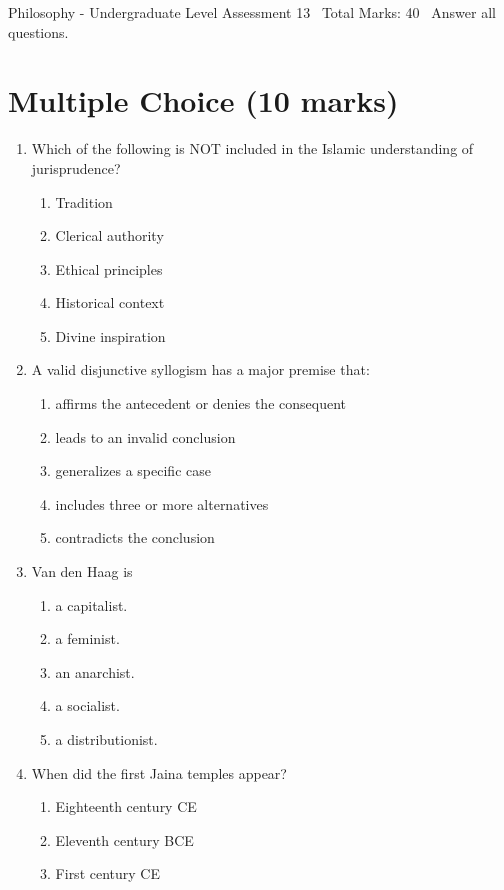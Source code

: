 \documentclass[12pt]{article}
\begin{document}
\begin{center}
Philosophy - Undergraduate Level Assessment 13 \
Total Marks: 40 \
Answer all questions.
\end{center}

\section*{Multiple Choice (10 marks)}
\begin{enumerate}[label=\arabic*.]
\item Which of the following is NOT included in the Islamic understanding of jurisprudence?
\begin{enumerate}[label=(\alph*)]
    \item Tradition
    \item Clerical authority
    \item Ethical principles
    \item Historical context
    \item Divine inspiration
\end{enumerate}
\item A valid disjunctive syllogism has a major premise that:
\begin{enumerate}[label=(\alph*)]
    \item affirms the antecedent or denies the consequent
    \item leads to an invalid conclusion
    \item generalizes a specific case
    \item includes three or more alternatives
    \item contradicts the conclusion
\end{enumerate}
\item Van den Haag is
\begin{enumerate}[label=(\alph*)]
    \item a capitalist.
    \item a feminist.
    \item an anarchist.
    \item a socialist.
    \item a distributionist.
\end{enumerate}
\item When did the first Jaina temples appear?
\begin{enumerate}[label=(\alph*)]
    \item Eighteenth century CE
    \item Eleventh century BCE
    \item First century CE

\end{enumerate}
\end{enumerate}
\end{document}

